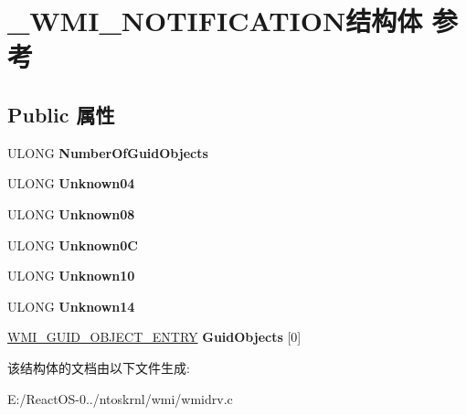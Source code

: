 \hypertarget{struct___w_m_i___n_o_t_i_f_i_c_a_t_i_o_n}{}\section{\+\_\+\+W\+M\+I\+\_\+\+N\+O\+T\+I\+F\+I\+C\+A\+T\+I\+O\+N结构体 参考}
\label{struct___w_m_i___n_o_t_i_f_i_c_a_t_i_o_n}
\subsection*{Public 属性}
\begin{DoxyCompactItemize}
\item 
\mbox{\label{struct___w_m_i___n_o_t_i_f_i_c_a_t_i_o_n_a44908c42000630ab2d200f1ed1221e9a}} 
U\+L\+O\+NG {\bfseries Number\+Of\+Guid\+Objects}
\item 
\mbox{\label{struct___w_m_i___n_o_t_i_f_i_c_a_t_i_o_n_ac5b804319a20bb05a9981d62a47ea0fd}} 
U\+L\+O\+NG {\bfseries Unknown04}
\item 
\mbox{\label{struct___w_m_i___n_o_t_i_f_i_c_a_t_i_o_n_af8838afaafded8368fdc11fde8c4c6c9}} 
U\+L\+O\+NG {\bfseries Unknown08}
\item 
\mbox{\label{struct___w_m_i___n_o_t_i_f_i_c_a_t_i_o_n_a9e3aa163b70e79a0cf9af42ee342dedf}} 
U\+L\+O\+NG {\bfseries Unknown0C}
\item 
\mbox{\label{struct___w_m_i___n_o_t_i_f_i_c_a_t_i_o_n_ad6ac024c7fa68820430011351bead15a}} 
U\+L\+O\+NG {\bfseries Unknown10}
\item 
\mbox{\label{struct___w_m_i___n_o_t_i_f_i_c_a_t_i_o_n_ac621eb33da8efced6a44863525a4678b}} 
U\+L\+O\+NG {\bfseries Unknown14}
\item 
\mbox{\label{struct___w_m_i___n_o_t_i_f_i_c_a_t_i_o_n_a1eccad95ec0f80ad57952e1546e71a94}} 
\hyperlink{struct___w_m_i___g_u_i_d___o_b_j_e_c_t___e_n_t_r_y}{W\+M\+I\+\_\+\+G\+U\+I\+D\+\_\+\+O\+B\+J\+E\+C\+T\+\_\+\+E\+N\+T\+RY} {\bfseries Guid\+Objects} \mbox{[}0\mbox{]}
\end{DoxyCompactItemize}


该结构体的文档由以下文件生成\+:\begin{DoxyCompactItemize}
\item 
E\+:/\+React\+O\+S-\/0../ntoskrnl/wmi/wmidrv.\+c\end{DoxyCompactItemize}
